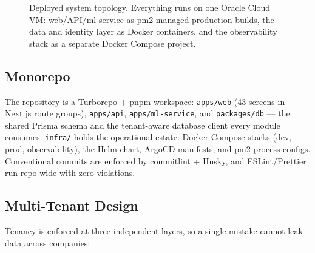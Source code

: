 \documentclass[11pt,a4paper]{article}
\newcommand{\code}[1]{\texttt{\small #1}}
\begin{document}
\begin{figure}[H]
\caption{Deployed system topology. Everything runs on one Oracle Cloud VM: web/API/ml-service as
pm2-managed production builds, the data and identity layer as Docker containers, and the
observability stack as a separate Docker Compose project.}
\label{fig:topology}
\end{figure}

\subsection{Monorepo}

The repository is a Turborepo + pnpm workspace: \code{apps/web} (43 screens in Next.js
route groups), \code{apps/api}, \code{apps/ml-service}, and \code{packages/db} --- the
shared Prisma schema and the tenant-aware database client every module consumes.
\code{infra/} holds the operational estate: Docker Compose stacks (dev, prod,
observability), the Helm chart, ArgoCD manifests, and pm2 process configs.
Conventional commits are enforced by commitlint + Husky, and ESLint/Prettier run
repo-wide with zero violations.

\subsection{Multi-Tenant Design}

Tenancy is enforced at three independent layers, so a single mistake cannot leak data
across companies:
\end{document}
